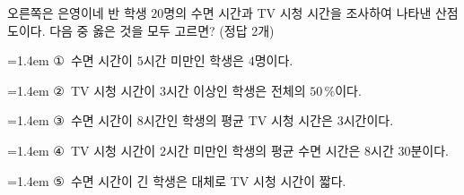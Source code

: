\noindent\begin{minipage}[t]{0.58\linewidth}\vspace{0pt}\raggedright 오른쪽은 은영이네 반 학생 $20$명의 수면 시간과 TV 시청 시간을 조사하여 나타낸 산점도이다. 다음 중 옳은 것을 모두 고르면? (정답 2개)\end{minipage}\hfill\begin{minipage}[t]{0.4\linewidth}\vspace{0pt}\centering \resizebox{\ifdim\width>\linewidth\linewidth\else\width\fi}{!}{}\end{minipage}\par
\par\medskip\par\noindent\hangindent=1.4em {\small ①}\ 수면 시간이 $5$시간 미만인 학생은 $4$명이다.\par\noindent\hangindent=1.4em {\small ②}\ TV 시청 시간이 $3$시간 이상인 학생은 전체의 $50\,\%$이다.\par\noindent\hangindent=1.4em {\small ③}\ 수면 시간이 $8$시간인 학생의 평균 TV 시청 시간은 $3$시간이다.\par\noindent\hangindent=1.4em {\small ④}\ TV 시청 시간이 $2$시간 미만인 학생의 평균 수면 시간은 $8$시간 $30$분이다.\par\noindent\hangindent=1.4em {\small ⑤}\ 수면 시간이 긴 학생은 대체로 TV 시청 시간이 짧다.\par\medskip
